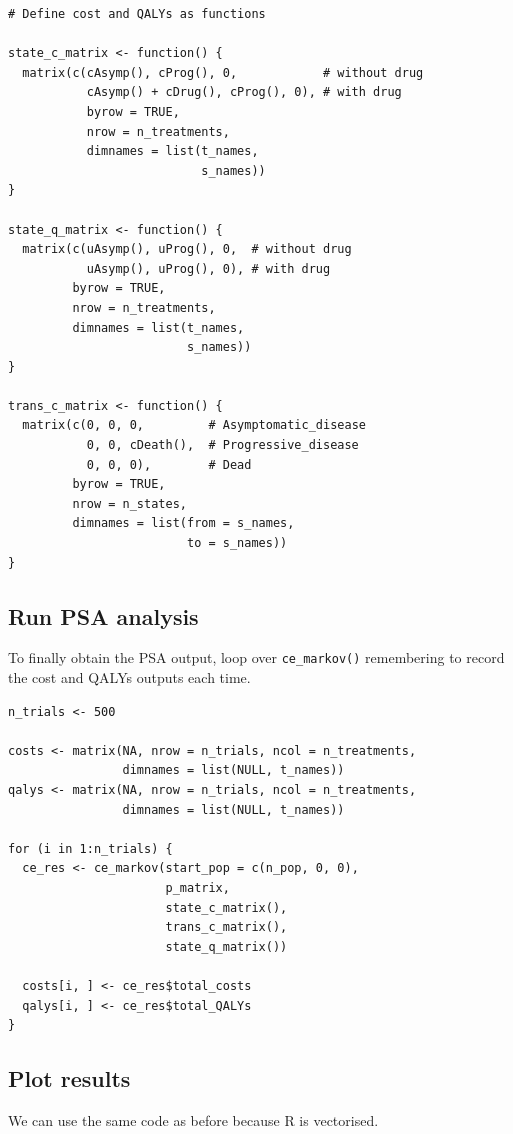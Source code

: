 \documentclass[a4paper,twoside,openany]{../svmonoBUGS}\usepackage[]{graphicx}\usepackage[]{color}
\begin{document}
\begin{verbatim}
# Define cost and QALYs as functions

state_c_matrix <- function() {
  matrix(c(cAsymp(), cProg(), 0,            # without drug
           cAsymp() + cDrug(), cProg(), 0), # with drug
           byrow = TRUE,
           nrow = n_treatments,
           dimnames = list(t_names,
                           s_names))
}

state_q_matrix <- function() {
  matrix(c(uAsymp(), uProg(), 0,  # without drug
           uAsymp(), uProg(), 0), # with drug
         byrow = TRUE,
         nrow = n_treatments,
         dimnames = list(t_names,
                         s_names))
}

trans_c_matrix <- function() {
  matrix(c(0, 0, 0,         # Asymptomatic_disease
           0, 0, cDeath(),  # Progressive_disease
           0, 0, 0),        # Dead
         byrow = TRUE,
         nrow = n_states,
         dimnames = list(from = s_names,
                         to = s_names))
}
\end{verbatim}

\subsection{ Run PSA analysis}
To finally obtain the PSA output, loop over \texttt{ce\_markov()} remembering to record the cost and QALYs outputs each time.

\begin{verbatim}
n_trials <- 500

costs <- matrix(NA, nrow = n_trials, ncol = n_treatments,
                dimnames = list(NULL, t_names))
qalys <- matrix(NA, nrow = n_trials, ncol = n_treatments,
                dimnames = list(NULL, t_names))

for (i in 1:n_trials) {
  ce_res <- ce_markov(start_pop = c(n_pop, 0, 0),
                      p_matrix,
                      state_c_matrix(),
                      trans_c_matrix(),
                      state_q_matrix())
  
  costs[i, ] <- ce_res$total_costs
  qalys[i, ] <- ce_res$total_QALYs
}
\end{verbatim}



\subsection{Plot results}
We can use the same code as before because R is vectorised.
\end{document}

